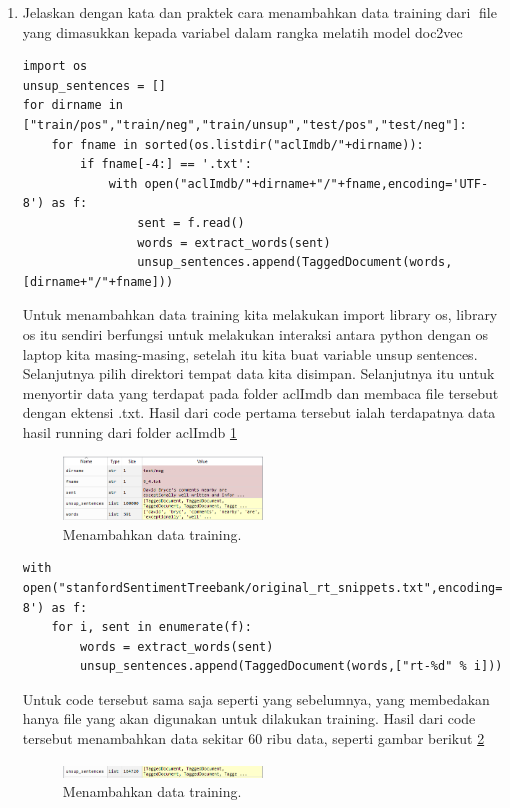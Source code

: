 \begin{enumerate}
\item Jelaskan dengan kata dan praktek cara menambahkan data training dari file yang dimasukkan kepada variabel dalam rangka melatih model doc2vec
\begin{verbatim}
import os
unsup_sentences = []
for dirname in ["train/pos","train/neg","train/unsup","test/pos","test/neg"]:
    for fname in sorted(os.listdir("aclImdb/"+dirname)):
        if fname[-4:] == '.txt':
            with open("aclImdb/"+dirname+"/"+fname,encoding='UTF-8') as f:
                sent = f.read()
                words = extract_words(sent)
                unsup_sentences.append(TaggedDocument(words,[dirname+"/"+fname]))
\end{verbatim}
Untuk menambahkan data training kita melakukan import library os, library os itu sendiri berfungsi untuk melakukan interaksi antara python dengan os laptop kita masing-masing, setelah itu kita buat variable unsup sentences. Selanjutnya pilih direktori tempat data kita disimpan. Selanjutnya itu untuk menyortir data yang terdapat pada folder aclImdb dan membaca file tersebut dengan ektensi .txt. Hasil dari code pertama tersebut ialah terdapatnya data hasil running dari folder aclImdb \ref{sim9}
		\begin{figure}[!htbp]
		\centerline{\includegraphics[width=0.5\textwidth]{figures/im/sim9.png}}
		\caption{Menambahkan data training.}
		\label{sim9}
		\end{figure}

\begin{verbatim}
with open("stanfordSentimentTreebank/original_rt_snippets.txt",encoding='UTF-8') as f:
    for i, sent in enumerate(f):
        words = extract_words(sent)
        unsup_sentences.append(TaggedDocument(words,["rt-%d" % i]))
\end{verbatim}
Untuk code tersebut sama saja seperti yang sebelumnya, yang membedakan hanya file yang akan digunakan untuk dilakukan training. Hasil dari code tersebut menambahkan data sekitar 60 ribu data, seperti gambar berikut \ref{sim10}
		\begin{figure}[!htbp]
		\centerline{\includegraphics[width=0.5\textwidth]{figures/im/sim10.png}}
		\caption{Menambahkan data training.}
		\label{sim10}
		\end{figure}


\end{enumerate}

